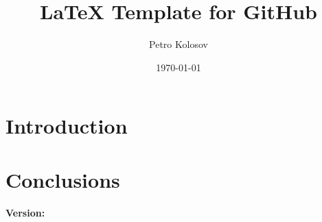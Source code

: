 \documentclass[12pt,letterpaper,oneside,reqno]{amsart}
\title[LaTeX Template for GitHub]
{LaTeX Template for GitHub}
\author[Petro Kolosov]{Petro Kolosov}
\date{\today}
\numberwithin{equation}{section}
\begin{document}
    \begin{abstract}
        
    \end{abstract}

    \maketitle

    \tableofcontents



    \section{Introduction} \label{sec:introduction}
    


    \section{Conclusions}\label{sec:conclusions}
    

    
    
    \noindent \textbf{Version:} 
\end{document}
